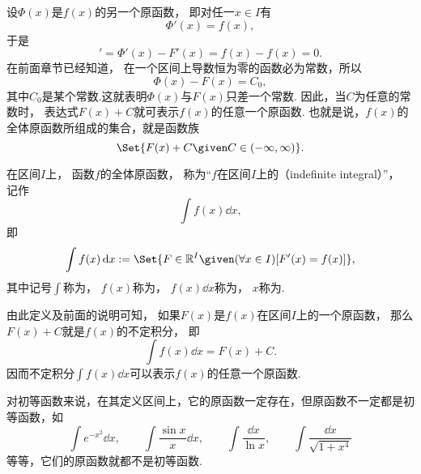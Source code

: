 设\(\Phi(x)\)是\(f(x)\)的另一个原函数，
即对任一\(x \in I\)有\begin{equation*}
	\Phi'(x) = f(x),
\end{equation*}
于是\begin{equation*}
	[\Phi(x) - F(x)]' = \Phi'(x) - F'(x) = f(x) - f(x) = 0.
\end{equation*}
在前面章节已经知道，
在一个区间上导数恒为零的函数必为常数，所以\begin{equation*}
	\Phi(x) - F(x) = C_0,
\end{equation*}
其中\(C_0\)是某个常数.这就表明\(\Phi(x)\)与\(F(x)\)只差一个常数.
因此，当\(C\)为任意的常数时，
表达式\(F(x) + C\)就可表示\(f(x)\)的任意一个原函数.
也就是说，\(f(x)\)的全体原函数所组成的集合，就是函数族\begin{equation*}
	\Set{ F(x) + C \given C \in (-\infty,\infty) }.
\end{equation*}

\begin{definition}
在区间\(I\)上，
函数\(f\)的全体原函数，
称为“\(f\)在区间\(I\)上的（indefinite integral）”，
记作\begin{equation*}
	\int f(x) \dd{x},
\end{equation*}
即\begin{equation*}
	\int f(x) \dd{x}
	\defeq
	\Set{ F \in \mathbb{R}^I \given (\forall x \in I)[F'(x) = f(x)] },
\end{equation*}
其中记号\(\int\)称为，
\(f(x)\)称为，
\(f(x) \dd{x}\)称为，
\(x\)称为.
\end{definition}
由此定义及前面的说明可知，
如果\(F(x)\)是\(f(x)\)在区间\(I\)上的一个原函数，
那么\(F(x) + C\)就是\(f(x)\)的不定积分，
即\begin{equation*}
	\int f(x) \dd{x} = F(x) + C.
\end{equation*}
因而不定积分\(\int f(x) \dd{x}\)可以表示\(f(x)\)的任意一个原函数.

对初等函数来说，在其定义区间上，它的原函数一定存在，但原函数不一定都是初等函数，如\begin{equation*}
	\int e^{-x^2} \dd{x}, \qquad
	\int \frac{\sin x}{x} \dd{x}, \qquad
	\int \frac{\dd{x}}{\ln{x}}, \qquad
	\int \frac{\dd{x}}{\sqrt{1+x^4}}
\end{equation*}
等等，它们的原函数就都不是初等函数.

